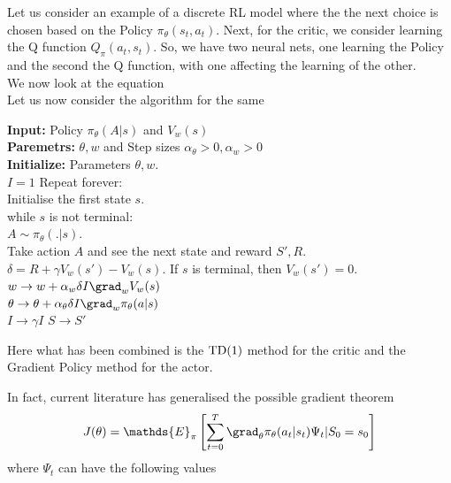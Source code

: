 \begin{tcolorbox}[title=Actor-critic example,breakable]
    Let us consider an example of a discrete RL model where the the next choice is chosen based on the Policy $\pi_{\theta}(s_t,a_t)$. Next, for the critic, we consider learning the Q function $Q_{\pi}(a_t,s_t)$. So, we have two neural nets, one learning the Policy and the second the Q function, with one affecting the learning of the other. \\ 
    We now look at the equation 
    \\
    Let us now consider the algorithm for the same
    \begin{tcolorbox}[title = Actor critic algorithm,breakable]
        \textbf{Input:} Policy $\pi_{\theta}(A|s)$ and $V_{w}(s)$\\
        \textbf{Paremetrs:} $\theta,w$ and Step sizes $\alpha_{\theta}>0,\alpha_{w}>0$\\
        \textbf{Initialize:} Parameters $\theta,w$.\\
        $I=1$
        Repeat forever:\\
        \null\quad Initialise the first state $s$.\\
        \null\quad while $s$ is not terminal:\\
        \null\quad\quad $A\sim \pi_{\theta}(.|s)$.\\
        \null\quad\quad Take action $A$ and see the next state and reward $S',R$. \\
        \null\quad\quad $\delta = R+ \gamma V_{w}(s')-V_{w}(s)$. If $s$ is terminal, then $V_w(s')=0$.
        \null\quad\quad $w \rightarrow w + \alpha_w \delta I \grad_w V_w(s)$ \\
        \null\quad\quad $\theta \rightarrow \theta + \alpha_{\theta} \delta I \grad_w \pi_{\theta}(a|s)$\\
        \null\quad\quad $I\rightarrow\gamma I$
        \null\quad\quad $S\rightarrow S'$
    \end{tcolorbox}     
    Here what has been combined is the $\rm{TD}(1)$ method for the critic and the Gradient Policy method for the actor. 
\end{tcolorbox}
In fact, current literature has generalised the possible gradient theorem
\begin{align}
    J(\theta) = \mathds{E}_{\pi}\left[ \sum^T_{t=0} \grad_{\theta}\pi_{\theta}(a_t|s_t) \Psi_t | S_0 = s_0 \right]
\end{align}
where $\Psi_t$ can have the following values
